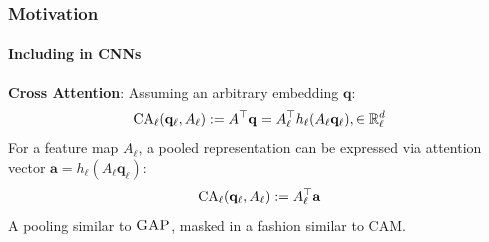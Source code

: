 \begin{frame}[t]
    \frametitle{Motivation}
    \framesubtitle{Including  in CNNs}
    \textbf{Cross Attention}:
    Assuming an arbitrary embedding $\mathbf{q}$:
    \begin{equation}
        \mbox{CA}_\ell(\mathbf{q}_\ell, A_\ell) \mathrel{:=} A^\top \mathbf{q} = A_\ell^\top h_\ell 
        (A_\ell \mathbf{q}_\ell), \in \mathbb{R}^d_\ell
        \label{eq:pooling_1}
    \end{equation}
    \pause
    For a feature map $A_\ell$, a pooled representation can be expressed via attention vector 
    $\mathbf{a} = h_\ell(A_\ell\mathbf{q}_\ell)$:
    \begin{equation}
        \mbox{CA}_\ell(\mathbf{q}_\ell, A_\ell)\defn A_\ell\tran\mathbf{a}%
    \end{equation}
    \pause
    A pooling similar to $\textsc{GAP}$, masked in a fashion similar to CAM.
\end{frame}
